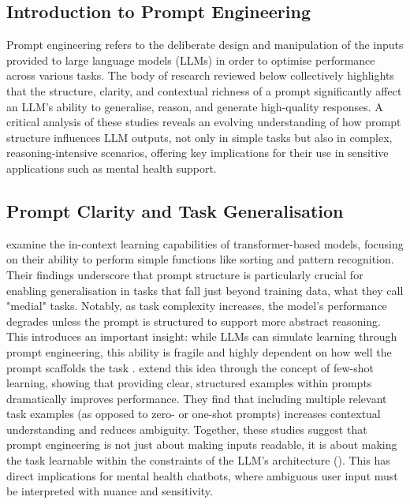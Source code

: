 \subsection{Introduction to Prompt Engineering} 
Prompt engineering refers to the deliberate design and manipulation of the inputs provided to large language models (LLMs) in order to optimise performance across various tasks. The body of research reviewed below collectively highlights that the structure, clarity, and contextual richness of a prompt significantly affect an LLM’s ability to generalise, reason, and generate high-quality responses. A critical analysis of these studies reveals an evolving understanding of how prompt structure influences LLM outputs, not only in simple tasks but also in complex, reasoning-intensive scenarios, offering key implications for their use in sensitive applications such as mental health support.

\subsection{Prompt Clarity and Task Generalisation} 
\cite{garg2021transformers} examine the in-context learning capabilities of transformer-based models, focusing on their ability to perform simple functions like sorting and pattern recognition. Their findings underscore that prompt structure is particularly crucial for enabling generalisation in tasks that fall just beyond training data, what they call "medial" tasks. Notably, as task complexity increases, the model's performance degrades unless the prompt is structured to support more abstract reasoning. This introduces an important insight: while LLMs can simulate learning through prompt engineering, this ability is fragile and highly dependent on how well the prompt scaffolds the task \cite{garg2021transformers}.
\cite{brown2020language} extend this idea through the concept of few-shot learning, showing that providing clear, structured examples within prompts dramatically improves performance. They find that including multiple relevant task examples (as opposed to zero- or one-shot prompts) increases contextual understanding and reduces ambiguity. Together, these studies suggest that prompt engineering is not just about making inputs readable, it is about making the task learnable within the constraints of the LLM’s architecture (\cite{brown2020language}). This has direct implications for mental health chatbots, where ambiguous user input must be interpreted with nuance and sensitivity.


